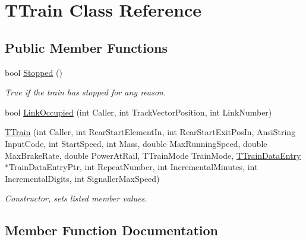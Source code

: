 \hypertarget{class_t_train}{}\section{T\+Train Class Reference}
\label{class_t_train}
\subsection*{Public Member Functions}
\begin{DoxyCompactItemize}
\item 
\mbox{\label{class_t_train_a2a2d78164c9dc1881b2c77526f04903f}} 
bool \mbox{\hyperlink{class_t_train_a2a2d78164c9dc1881b2c77526f04903f}{Stopped}} ()
\begin{DoxyCompactList}\small\item\em True if the train has stopped for any reason. \end{DoxyCompactList}\item 
bool \mbox{\hyperlink{class_t_train_aef32cd9a007874ab09ceeac907e7c88b}{Link\+Occupied}} (int Caller, int Track\+Vector\+Position, int Link\+Number)
\item 
\mbox{\label{class_t_train_ae9d788d7bf536de1efe7a67ab5bb8dd7}} 
\mbox{\hyperlink{class_t_train_ae9d788d7bf536de1efe7a67ab5bb8dd7}{T\+Train}} (int Caller, int Rear\+Start\+Element\+In, int Rear\+Start\+Exit\+Pos\+In, Ansi\+String Input\+Code, int Start\+Speed, int Mass, double Max\+Running\+Speed, double Max\+Brake\+Rate, double Power\+At\+Rail, T\+Train\+Mode Train\+Mode, \mbox{\hyperlink{class_t_train_data_entry}{T\+Train\+Data\+Entry}} $\ast$Train\+Data\+Entry\+Ptr, int Repeat\+Number, int Incremental\+Minutes, int Incremental\+Digits, int Signaller\+Max\+Speed)
\begin{DoxyCompactList}\small\item\em Constructor, sets listed member values. \end{DoxyCompactList}\end{DoxyCompactItemize}


\subsection{Member Function Documentation}
\mbox{\label{class_t_train_aef32cd9a007874ab09ceeac907e7c88b}} 
